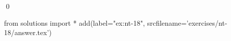 
\begin{ex} 
  \label{ex:nt-18}
  
  \qed
\end{ex} 
\begin{python0}
from solutions import *
add(label="ex:nt-18",
    srcfilename='exercises/nt-18/answer.tex') 
\end{python0}
